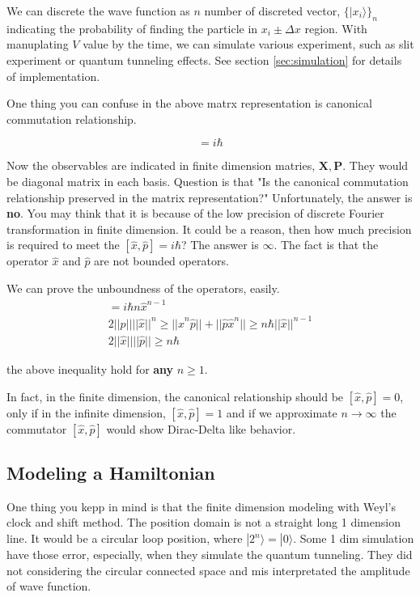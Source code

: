 We can discrete the wave function as $n$ number of discreted vector, $\{|x_i \rangle \}_{n}$ indicating the probability of finding the particle in $x_i \pm \Delta x$ region.
With manuplating $V$ value by the time, we can simulate various experiment, such as slit experiment or quantum tunneling effects.
See section \ref{sec:simulation} for details of implementation.


One thing you can confuse in the above matrx representation is canonical commutation relationship. 

\begin{equation}
    [\hat{x}, \hat{p}] = i \hbar
\end{equation}

Now the observables are indicated in finite dimension matries,  $\mathbf{X}, \mathbf{P}$. 
They would be diagonal matrix in each basis. Question is that "Is the canonical commutation relationship preserved in 
the matrix representation?" Unfortunately, the answer is \textbf{no}.
You may think that it is because of the low precision of discrete Fourier transformation in finite dimension.
It could be a reason, then how much precision is required to meet the $[\hat{x}, \hat{p}] = i \hbar$?  
The answer is $\infty$. The fact is that the operator $\hat{x}$ and $\hat{p}$ are not bounded operators. 

We can prove the unboundness of the operators, easily.
\begin{align*}
    [\hat{x}^n, \hat{p}] = i \hbar n \hat{x}^{n-1}\\
    2 ||\hat{p}|| || \hat{x}||^n \geq || \hat{x}^n \hat{p} || + || \hat{p} \hat{x}^n || \geq n \hbar ||\hat{x}||^{n-1}\\
    2 ||\hat{x}|| ||\hat{p}|| \geq n \hbar
\end{align*}

the above inequality hold for \textbf{any} $n\geq 1$. 

In fact, in the finite dimension, the canonical relationship should be $[\hat{x}, \hat{p}] = 0$,
only if in the infinite dimension, $[\hat{x}, \hat{p}] = 1$ and if we approximate $n\rightarrow \infty$ 
the commutator $[\hat{x}, \hat{p}]$ would show Dirac-Delta like behavior\cite{santhanam_quantum_1976}.

\subsection{Modeling a Hamiltonian}

One thing you kepp in mind is that 
the finite dimension modeling with Weyl's clock and shift method.
The position domain is not a straight long 1 dimension line.
It would be a circular loop position, where $|2^n \rangle= |0 \rangle$.
Some 1 dim simulation have those error, especially, when they simulate 
the quantum tunneling. 
They did not considering the circular connected space and 
mis interpretated the amplitude of wave function. %

